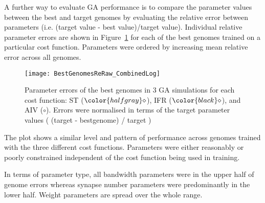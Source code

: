 A further way to evaluate GA performance is to compare the parameter values
between the best and target genomes by evaluating the relative error
between parameters (i.e. (target value - best value)/target value). Individual 
relative parameter errors are shown in Figure~\ref{fig:GA:R2} for
each of the best genomes trained on a particular cost function. Parameters
were ordered by increasing mean relative error across all genomes.

\smallskip{}

\begin{figure}[th!]
  \centering
  \texttt{[image: BestGenomesReRaw\_CombinedLog]}
  \caption{Parameter errors of the best genomes in 3 GA
    simulations for each cost function: ST (${\color{halfgray} \diamond }$), IFR (${\color{black} \diamond }$), and AIV (${\circ}$). Errors were normalised in terms
    of the target parameter values ( (target - bestgenome) / target )}\label{fig:GA:R2}
\end{figure}


The plot shows a similar level and pattern of performance across
genomes trained with the three different cost functions. Parameters were
either reasonably or poorly constrained independent of the cost function
being used in training.

\smallskip{}

In terms of parameter type, all bandwidth parameters were in the upper half
of genome errors whereas synapse number parameters were predominantly in
the lower half.  Weight parameters are spread over the whole range.


% 



